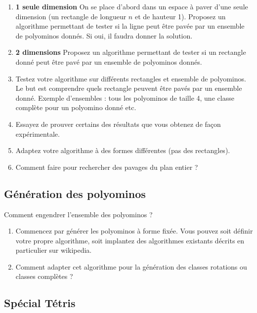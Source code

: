 \documentclass{../ficheTDTP}
\begin{document}
\begin{enumerate}

\item \textbf{1 seule dimension} On se place d'abord dans un espace à paver d'une seule dimension (un rectangle de longueur $n$ et de hauteur 1). Proposez un algorithme permettant de tester si la ligne peut être pavée par un ensemble de polyominos donnés. Si oui, il faudra donner la solution.

\item \textbf{2 dimensions} Proposez un algorithme permettant de tester si un rectangle donné peut être pavé par un ensemble de polyominos donnés. 

\item Testez votre algorithme sur différents rectangles et ensemble de polyominos. Le but est comprendre quels rectangle peuvent être pavés par un ensemble donné. Exemple d'ensembles : tous les polyominos de taille 4, une classe complète pour un polyomino donné etc.

\item Essayez de prouver certains des résultats que vous obtenez de façon expérimentale.

\item Adaptez votre algorithme à des formes différentes (pas des rectangles).

\item Comment faire pour rechercher des pavages du plan entier ?

\end{enumerate}

\subsection{Génération des polyominos}

Comment engendrer l'ensemble des polyominos ? 

\begin{enumerate}
\item Commencez par générer les polyominos à forme fixée. Vous pouvez soit définir votre propre algorithme, soit implantez des algorithmes existants décrits en particulier sur wikipedia.

\item Comment adapter cet algorithme pour la génération des classes rotations ou classes complètes ?
\end{enumerate}


\subsection{Spécial Tétris}
\end{document}
